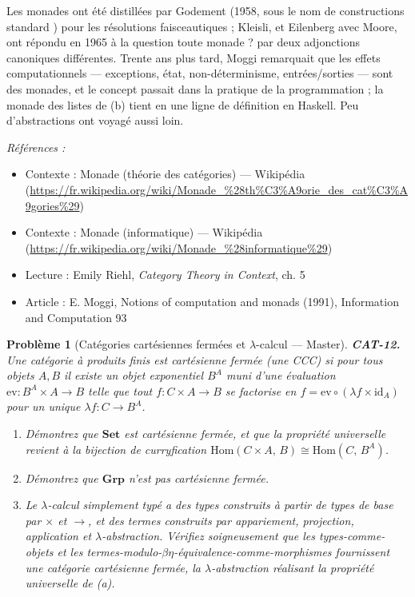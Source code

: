 \documentclass[11pt]{article}
\newtheorem{problem}{Problème}
\newenvironment{refs}{\par\small\noindent\emph{Références :}\begin{itemize}\setlength\itemsep{0pt}}{\end{itemize}\normalsize}
\begin{document}
\noindent Les monades ont été distillées par Godement (1958, sous le nom de
\og{} constructions standard \fg{}) pour les résolutions faisceautiques ; Kleisli, et Eilenberg avec
Moore, ont répondu en 1965 à la question \og{} toute monade ? \fg{} par deux adjonctions canoniques
différentes. Trente ans plus tard, Moggi remarquait que les effets computationnels --- exceptions,
état, non-déterminisme, entrées/sorties --- sont des monades, et le concept passait dans la pratique
de la programmation ; la monade des listes de (b) tient en une ligne de définition en Haskell. Peu
d'abstractions ont voyagé aussi loin.

\begin{refs}
\item Contexte : Monade (théorie des catégories) --- Wikipédia (\url{https://fr.wikipedia.org/wiki/Monade_%28th%C3%A9orie_des_cat%C3%A9gories%29})
\item Contexte : Monade (informatique) --- Wikipédia (\url{https://fr.wikipedia.org/wiki/Monade_%28informatique%29})
\item Lecture : Emily Riehl, \textit{Category Theory in Context}, ch. 5
\item Article : E. Moggi, \og{} Notions of computation and monads \fg{} (1991), Information and Computation 93
\end{refs}

\bigskip

\begin{problem}[{Catégories cartésiennes fermées et $\lambda$-calcul --- Master}]
\textbf{CAT-12.} Une catégorie à produits finis est \textit{cartésienne
fermée} (une CCC) si pour tous objets $ A, B $ il existe un objet exponentiel $ B^A $
muni d'une évaluation $ \mathrm{ev}\colon B^A \times A \to B $ telle que tout
$ f\colon C \times A \to B $ se factorise en $ f = \mathrm{ev} \circ (\lambda f \times
\mathrm{id}_A) $ pour un unique $ \lambda f\colon C \to B^A $.
\begin{enumerate}
\item[(a)] Démontrez que
$ \mathbf{Set} $ est cartésienne fermée, et que la propriété universelle revient à la bijection
de curryfication $ \mathrm{Hom}(C \times A,\, B) \cong \mathrm{Hom}(C,\, B^A) $.
\item[(b)] Démontrez que $ \mathbf{Grp} $ n'est pas cartésienne fermée.
\item[(c)] Le $\lambda$-calcul simplement typé
a des types construits à partir de types de base par $ \times $ et $ \to $, et des termes
construits par appariement, projection, application et $\lambda$-abstraction. Vérifiez soigneusement que
les types-comme-objets et les termes-modulo-$ \beta\eta $-équivalence-comme-morphismes
fournissent une catégorie cartésienne fermée, la $\lambda$-abstraction réalisant la propriété universelle
de (a).
\end{enumerate}

\end{problem}
\end{document}

